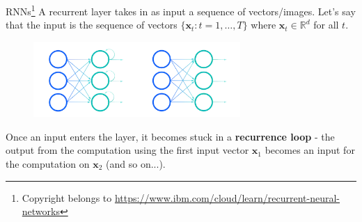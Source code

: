 \documentclass{beamer}
\begin{document}
\begin{frame}{RNNs\footnote{Copyright belongs to \url{https://www.ibm.com/cloud/learn/recurrent-neural-networks}}}
A recurrent layer takes in as input a sequence of vectors/images. Let's say that the input is the sequence of vectors $\{\mathbf{x}_t:t=1,\dots,T\}$ where $\mathbf{x}_t\in\mathbb{R}^d$ for all $t$.

\begin{figure}
\centering
\includegraphics[width=0.7\textwidth]{Images/rnn.png}
\end{figure}
Once an input enters the layer, it becomes stuck in a \textbf{recurrence loop} - the output from the computation using the first input vector $\mathbf{x}_1$ becomes an input for the computation on $\mathbf{x}_2$ (and so on...).
\end{frame}
\end{document}
